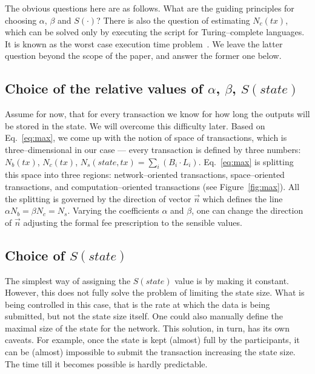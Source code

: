 \documentclass[]{llncs}   %
\newcommand{\authnote}[2]{\marginpar{\parbox{\marginparwidth}{\tiny %
  \textsf{#1 {\textcolor{blue}{notes: #2}}}}}%
  \textcolor{blue}{\textbf{\dag}}}
\newcommand{\authnote}[2]{
  \textsf{#1\textcolor{blue}{ #2}}}
\newcommand{\authnote}[2]{}
\newcommand{\dnote}[1]{{\authnote{\textcolor{red}{Dima notes:}}{#1}}}
\begin{document}
The obvious questions here are as follows. What are the guiding principles for
choosing $\alpha$, $\beta$ and $S(\cdot)$? There is also the
question of estimating $N_c(tx)$, which can be solved only by executing the
script for Turing--complete languages. It is known as the worst case execution
time problem~\cite{Wilhelm2008}.  We leave the latter question beyond the scope of
the paper, and answer the former one below.

\subsection{Choice of the relative values of $\alpha$, $\beta$, $S(state)$}

Assume for now, that for every transaction we know for how long the outputs will be
stored in the state. We will overcome this difficulty later. Based on
Eq.~\eqref{eq:max}, we come up with the notion of space of transactions, which
is three--dimensional in our case --- every transaction is defined by three
numbers: $N_b(tx)$, $N_c(tx)$, $N_s(state,tx) = \sum_i (B_i \cdot L_i)$. Eq.~\eqref{eq:max} is splitting 
this space into three regions: network--oriented transactions, space--oriented transactions, 
and computation--oriented transactions (see Figure~\ref{fig:max}). All the splitting 
is governed by the direction of vector $\vec{n}$ which defines the line $\alpha N_b=\beta N_c=N_s$.
Varying the coefficients $\alpha$ and $\beta$, one can change the direction of
$\vec{n}$ adjusting the formal fee prescription to the sensible values.

\subsection{Choice of $S(state)$}

The simplest way of assigning the $S(state)$ value is by making it constant.
However, %
this does not fully solve the problem of limiting the state size. What is being controlled in this case,
that is the rate at which the data is being submitted, but not the state size
itself. One could also manually define the maximal size of the state for the
network. This solution, in turn, has its own caveats. For example, once the
state is kept (almost) full by the participants, it can be (almost) impossible
to submit the transaction increasing the state size.  The time till it becomes
possible is hardly predictable. 
\end{document}
